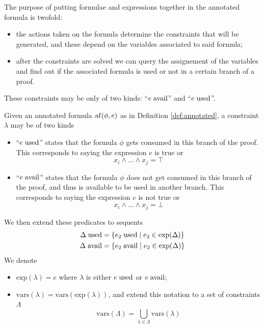 \documentclass[a4paper, 12pt, english]{report}
\begin{document}
\noindent The purpose of putting formulae and expressions together in the annotated formula is twofold:
\begin{itemize}
	\item the actions taken on the formula determine the constraints that will be generated, and these depend on the variables associated to said formula;
	\item after the constraints are solved we can query the assignement of the variables and find out if the associated formula is used or not in a certain branch of a proof.
\end{itemize}
These constraints may be only of two kinds: ``$e \; \mathrm{avail}$'' and ``$e \; \mathrm{used}$''.
\begin{define}[Constraints]
	\label{def:constraints}
	Given an annotated formula $\mathrm{af}(\phi, e)$ as in Definition \ref{def:annotated}, a constraint $\lambda$ may be of two kinds
	\begin{itemize}
		\item ``$e \; \mathrm{used}$'' states that the formula $\phi$ gets consumed in this branch of the proof.
			This corresponds to saying the expression $e$ is true or
			$$ x_i \wedge \dots \wedge x_j = \top $$
		\item ``$e \; \mathrm{avail}$'' states that the formula $\phi$ does not get consumed in this branch of the proof, and thus is available to be used in another branch.
			This corresponds to saying the expression $e$ is not true or
			$$ x_i \wedge \dots \wedge x_j = \bot $$
	\end{itemize}
	We then extend these predicates to sequents
	\begin{align*}
		\Delta \; \mathrm{used} &= \{ e_2 \; \mathrm{used} \mid e_2 \in \text{exp}(\Delta) \} \\
		\Delta \; \mathrm{avail} &= \{ e_2 \; \mathrm{avail} \mid e_2 \in \text{exp}(\Delta) \}
	\end{align*}
	We denote
	\begin{itemize}
		\item $\text{exp}(\lambda) = e$ where $\lambda$ is either $e \; \mathrm{used}$ or $e \; \mathrm{avail}$;
		\item $\text{vars}(\lambda) = \text{vars}(\text{exp}(\lambda))$, and extend this notation to a set of constraints $\Lambda$
			$$ \text{vars}(\Lambda) = \bigcup_{\lambda \in \Lambda} \text{vars}(\lambda) $$
	\end{itemize}
\end{define}
\end{document}
